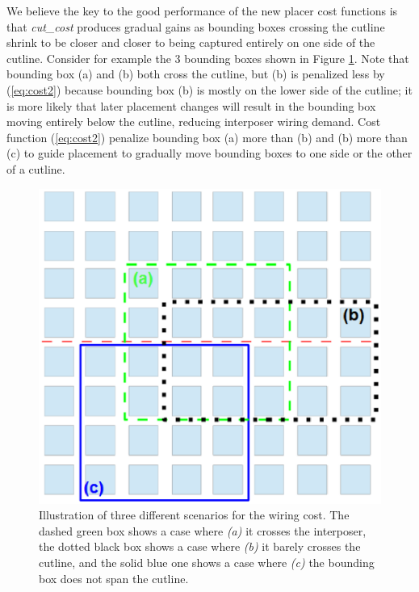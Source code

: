 \documentclass{sig-alternate-2013}
\begin{document}
We believe the key to the good performance of the new placer cost functions is that \textit{cut\_cost} produces gradual gains as bounding boxes crossing the cutline shrink to be closer and closer to being captured entirely on one side of the cutline. Consider for example the 3 bounding boxes shown in Figure \ref{fig:bb_illustration}. Note that bounding box (a) and (b) both cross the cutline, but (b) is penalized less by (\ref{eq:cost2}) because bounding box (b) is mostly on the lower side of the cutline; it is more likely that later placement changes will result in the bounding box moving entirely below the cutline, reducing interposer wiring demand. Cost function (\ref{eq:cost2}) penalize bounding box (a) more than (b) and (b) more than (c) to guide placement to gradually move bounding boxes to one side or the other of a cutline.

\begin{figure}[!h]
\centering
\includegraphics[width=\linewidth]{bb_new.eps}
\caption{Illustration of three different scenarios for the wiring cost. The dashed green box shows a case where \textit{(a)} it crosses the interposer, the dotted black box shows a case where \textit{(b)} it barely crosses the cutline, and the solid blue one shows a case where \textit{(c)} the bounding box does not span the cutline.}
\label{fig:bb_illustration}
\end{figure}
\end{document}

